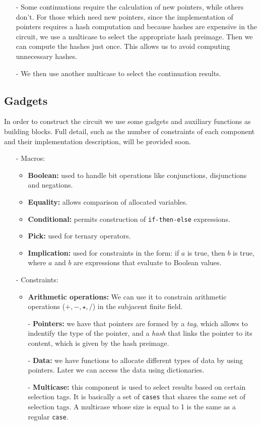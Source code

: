 \documentclass[10pt, english]{article}
\begin{document}
\begin{itemize}
  \item[-] Some continuations require the calculation of new pointers, while others don't. For those which need new pointers, since the implementation of pointers requires a hash computation and because hashes are expensive in the circuit, we use a multicase to select the appropriate hash preimage. Then we can compute the hashes just once. This allows us to avoid computing unnecessary hashes.
	\item[-] We then use another multicase to select the continuation results.
\end{itemize}

\subsection{Gadgets}

In order to construct the circuit we use some gadgets and auxiliary functions as building blocks. Full detail, such as the number of constraints of each component and their implementation description, will be provided soon.

\begin{itemize}
	\item[-] Macros:
	\begin{itemize}
		\item \textbf{Boolean:} used to handle bit operations like conjunctions, disjunctions and negations.
    \item \textbf{Equality:} allows comparison of allocated variables.
		\item \textbf{Conditional:} permits construction of \verb|if-then-else| expressions.
		\item \textbf{Pick:} used for ternary operators.
		\item \textbf{Implication:} used for constraints in the form: if $a$ is true, then $b$ is true, where $a$ and $b$ are expressions that evaluate to Boolean values.
	\end{itemize}
	\item[-] Constraints:
	\begin{itemize}
    \item \textbf{Arithmetic operations:} We can use it to constrain arithmetic operations ($+, -, \star, \slash$) in the subjacent finite field.
	  \item[-] \textbf{Pointers:} we have that pointers are formed by a \emph{tag}, which allows to indentify the type of the pointer, and a \emph{hash} that links the pointer to its content, which is given by the hash preimage.
    \item[-] \textbf{Data:} we have functions to allocate different types of data by using pointers. Later we can access the data using dictionaries.
    \item[-] \textbf{Multicase:} this component is used to select results based on certain selection tags. It is basically a set of \verb|cases| that shares the same set of selection tags. A multicase whose size is equal to 1 is the same as a regular \verb|case|.
  \end{itemize}
\end{itemize}
\end{document}
